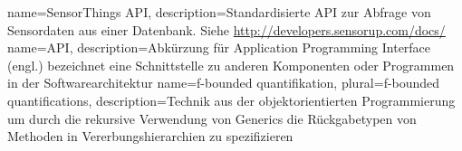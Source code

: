 \makenoidxglossaries
{}
{
	name=SensorThings \gls{API},
	description={Standardisierte \gls{API} zur Abfrage von Sensordaten aus einer Datenbank. Siehe \url{http://developers.sensorup.com/docs/}}
}
{
	name=API,
	description={Abkürzung für Application Programming Interface (engl.) bezeichnet eine Schnittstelle zu anderen Komponenten oder Programmen in der Softwarearchitektur}
}
{
    name=f-bounded quantifikation,
    plural=f-bounded quantifications,
    description={Technik aus der objektorientierten Programmierung um durch die rekursive Verwendung von Generics die Rückgabetypen von Methoden in Vererbungshierarchien zu spezifizieren}
}
